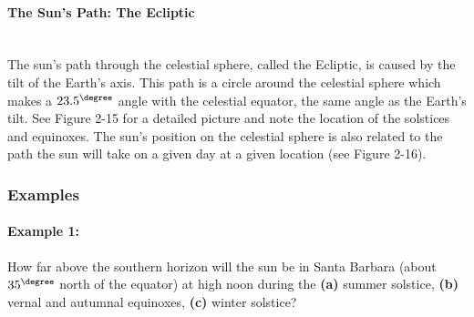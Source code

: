 \paragraph*{The Sun's Path: The Ecliptic}\hfill \\
The sun's path through the celestial sphere, called the Ecliptic, is caused by the tilt of the Earth's axis. This path is a circle around the celestial sphere which makes a $23.5^\degree$ angle with the celestial equator, the same angle as the Earth's tilt. See Figure 2-15 for a detailed picture and note the location of the solstices and equinoxes. The sun's position on the celestial sphere is also related to the path the sun will take on a given day at a given location (see Figure 2-16).

\subsubsection*{Examples}
\paragraph{Example 1:} How far above the southern horizon will the sun be in Santa Barbara (about $35^\degree$ north of the equator) at high noon during the \textbf{(a)} summer solstice, \textbf{(b)} vernal and autumnal equinoxes, \textbf{(c)} winter solstice?

